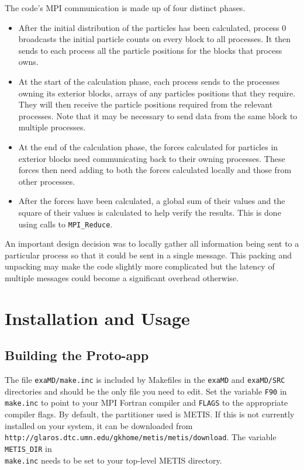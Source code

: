\documentclass[paper=a4, fontsize=11pt,bibtotoc]{scrartcl}		%
\newcommand{\TT}[1]{\texttt{#1}}
\begin{document}
The code's MPI communication is made up of four distinct phases.
\begin{itemize}
	\item{After the initial distribution of the particles has been calculated, process 0 broadcasts the initial particle counts on every block 
              to all processes. It then sends to each process all the particle positions for the blocks that process owns.}
	\item{At the start of the calculation phase, each process sends to the processes owning its exterior blocks, arrays of any particles 
              positions that they require. They will then receive the particle positions required from the relevant processes. Note that it may be 
              necessary to send data from the same block to multiple processes.}
 	\item{At the end of the calculation phase, the forces calculated for particles in exterior blocks need communicating back to their owning 
              processes. These forces then need adding to both the forces calculated locally and those from other processes.}
	\item{After the forces have been calculated, a global sum of their values and the square of their values is calculated to help verify the 
              results. This is done using calls to \texttt{MPI\_Reduce}.}
\end{itemize}
An important design decision was to locally gather all information being sent to a particular process so that it could be sent in a single message.  
This packing and unpacking may make the code slightly more complicated but the latency of multiple messages could become a significant overhead 
otherwise. 


\section{Installation and Usage}\label{SEC_Compile}

\subsection{Building the Proto-app}

The file \TT{exaMD/make.inc} is included by Makefiles in the \TT{exaMD} and \TT{exaMD/SRC} directories and should be the only file you need to edit. 
Set the variable \TT{F90} in \TT{make.inc} to point to your MPI Fortran compiler and \TT{FLAGS} to the appropriate compiler flags. 
By default, the partitioner used is METIS. If this is not currently installed on your system, it can be downloaded from\\
\TT{http://glaros.dtc.umn.edu/gkhome/metis/metis/download}. The variable \TT{METIS\_DIR} in\\ 
\TT{make.inc} needs to be set to your top-level METIS directory.
\end{document}
